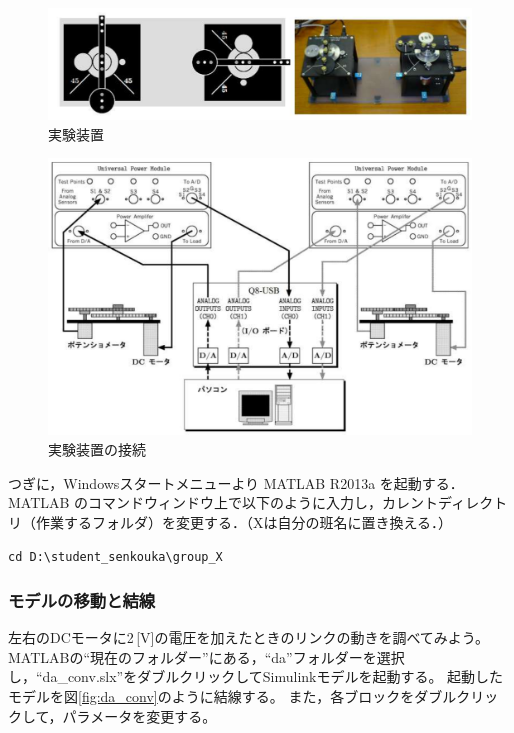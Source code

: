 \begin{figure}[H]
    \centering
    \includegraphics[width=0.8\linewidth]{figure/experiment_setup.pdf}
    \caption{実験装置}
    \label{fig:experiment_setup}
\end{figure}

\begin{figure}[H]
    \centering
    \includegraphics[width=0.95\linewidth]{figure/terminal_connection.pdf}
    \caption{実験装置の接続}
    \label{fig:terminal_connection}
\end{figure}

つぎに，Windowsスタートメニューより MATLAB R2013a を起動する．MATLAB のコマンドウィンドウ上で以下のように入力し，カレントディレクトリ（作業するフォルダ）を変更する．（Xは自分の班名に置き換える．）

\begin{tcolorbox}[colback=white,colframe=black]
    \verb|cd D:\student_senkouka\group_X|
    \end{tcolorbox}

    \subsubsection{モデルの移動と結線}

    左右のDCモータに2\,[V]の電圧を加えたときのリンクの動きを調べてみよう。
    MATLABの“現在のフォルダー”にある，“da”フォルダーを選択し，“da\_conv.slx”をダブルクリックしてSimulinkモデルを起動する。
    起動したモデルを図\ref{fig:da_conv}のように結線する。
    また，各ブロックをダブルクリックして，パラメータを変更する。
    

